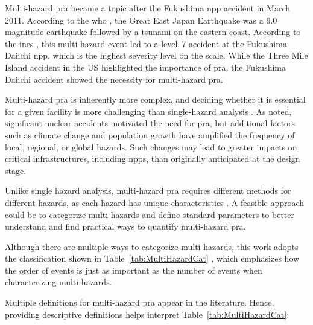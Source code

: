 Multi-hazard \acrshort{pra} became a topic after the Fukushima \acrshort{npp} accident in March 2011. According to the \acrshort{who} \cite{Great}, the Great East Japan Earthquake was a 9.0 magnitude earthquake followed by a tsunami on the eastern coast. According to the \acrshort{ines} \cite{International}, this multi-hazard event led to a level~7 accident at the Fukushima Daiichi \acrshort{npp}, which is the highest severity level on the scale. While the Three Mile Island accident in the US highlighted the importance of \acrshort{pra}, the Fukushima Daiichi accident showed the necessity for multi-hazard \acrshort{pra}.

Multi-hazard \acrshort{pra} is inherently more complex, and deciding whether it is essential for a given facility is more challenging than single-hazard analysis \cite{Wang2020review}. As noted, significant nuclear accidents motivated the need for \acrshort{pra}, but additional factors such as climate change and population growth have amplified the frequency of local, regional, or global hazards. Such changes may lead to greater impacts on critical infrastructures, including \acrshort{npp}s, than originally anticipated at the design stage.

Unlike single hazard analysis, multi-hazard \acrshort{pra} requires different methods for different hazards, as each hazard has unique characteristics \cite{Kappes2012Challenges}. A feasible approach could be to categorize multi-hazards and define standard parameters to better understand and find practical ways to quantify multi-hazard \acrshort{pra}.

Although there are multiple ways to categorize multi-hazards, this work adopts the classification shown in Table~\ref{tab:MultiHazardCat} \cite{Kim2019PRELIMINARY}, which emphasizes how the order of events is just as important as the number of events when characterizing multi-hazards.



Multiple definitions for multi-hazard \acrshort{pra} appear in the literature. Hence, providing descriptive definitions helps interpret Table~\ref{tab:MultiHazardCat}:


